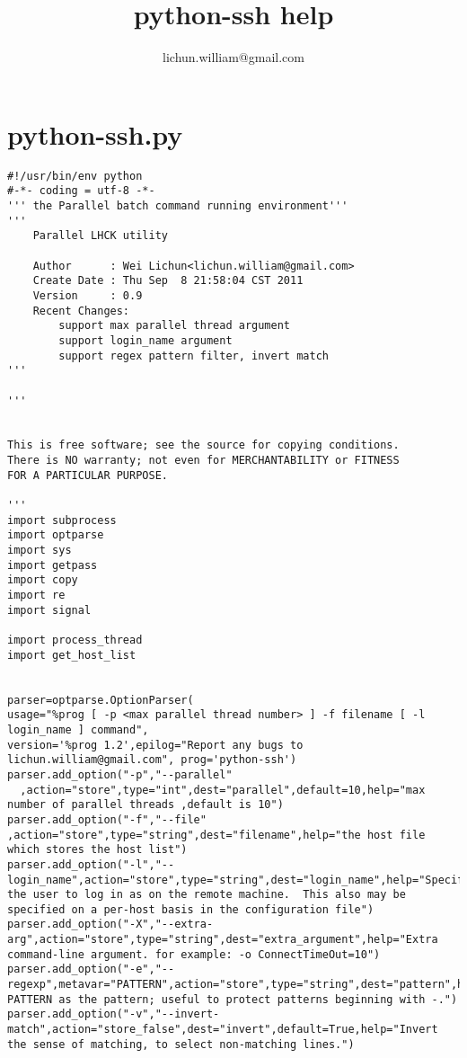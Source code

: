 \documentclass[a4paper,11pt]{article}
\title{python-ssh help}
\author{lichun.william@gmail.com}
\begin{document}
\maketitle
\tableofcontents


\section{python-ssh.py}
\lstset{language=Python}
\begin{lstlisting}
#!/usr/bin/env python
#-*- coding = utf-8 -*-
''' the Parallel batch command running environment'''
'''
    Parallel LHCK utility
        
    Author      : Wei Lichun<lichun.william@gmail.com>
    Create Date : Thu Sep  8 21:58:04 CST 2011
    Version     : 0.9
    Recent Changes:
        support max parallel thread argument
        support login_name argument
        support regex pattern filter, invert match
'''

'''


This is free software; see the source for copying conditions. 
There is NO warranty; not even for MERCHANTABILITY or FITNESS
FOR A PARTICULAR PURPOSE.

'''
import subprocess
import optparse
import sys
import getpass
import copy
import re
import signal

import process_thread
import get_host_list


parser=optparse.OptionParser(
usage="%prog [ -p <max parallel thread number> ] -f filename [ -l login_name ] command",
version='%prog 1.2',epilog="Report any bugs to lichun.william@gmail.com", prog='python-ssh')
parser.add_option("-p","--parallel"   
  ,action="store",type="int",dest="parallel",default=10,help="max number of parallel threads ,default is 10")
parser.add_option("-f","--file"   ,action="store",type="string",dest="filename",help="the host file which stores the host list")
parser.add_option("-l","--login_name",action="store",type="string",dest="login_name",help="Specifies the user to log in as on the remote machine.  This also may be specified on a per-host basis in the configuration file")
parser.add_option("-X","--extra-arg",action="store",type="string",dest="extra_argument",help="Extra command-line argument. for example: -o ConnectTimeOut=10")
parser.add_option("-e","--regexp",metavar="PATTERN",action="store",type="string",dest="pattern",help="Use PATTERN as the pattern; useful to protect patterns beginning with -.")
parser.add_option("-v","--invert-match",action="store_false",dest="invert",default=True,help="Invert the sense of matching, to select non-matching lines.")



\end{lstlisting}
\end{document}
